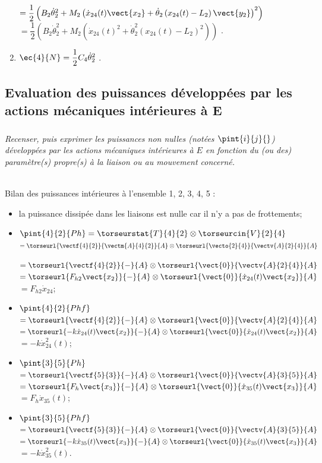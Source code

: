 \begin{multicols}{2}
\begin{corrige}
\begin{enumerate}
$=\dfrac{1}{2}\left( B_2 \dot{\theta}_2^2 +M_2\left(\dot{x}_{24}(t)  \vect{x_2}+\dot{\theta}_2\left(  x_{24}(t)  -L_2 \right)\vect{y_2}\right)^2  \right)
$ 
$=\dfrac{1}{2}\left( B_2 \dot{\theta}_2^2 +M_2\left(\dot{x}_{24}(t)^2+\dot{\theta}_2^2\left(  x_{24}(t)  -L_2 \right)^2\right)  \right)
$ 
.
\item $\ec{4}{N}=\dfrac{1}{2}C_4\dot{\theta}_2^2$ . 
\end{enumerate}
\end{corrige}
\else
\fi


\subsection*{Evaluation des puissances développées par les actions mécaniques intérieures à E}
\subparagraph{}\textit{Recenser, puis exprimer les puissances non nulles (notées $\pint{i}{j}{}$) développées par les actions mécaniques intérieures à $E$ en fonction du (ou des) paramètre(s) propre(s) à la liaison ou au mouvement concerné.}
\ifprof
\begin{corrige} ~\\

Bilan des puissances intérieures à l'ensemble 1, 2, 3, 4, 5 :
\begin{itemize}
\item la puissance dissipée dans les liaisons est nulle car il n'y a pas de frottements;
\item  $\pint{4}{2}{Ph} = \torseurstat{T}{4}{2}\otimes \torseurcin{V}{2}{4}$ 
$=\torseurl{\vectf{4}{2}}{\vectm{A}{4}{2}}{A}\otimes \torseurl{\vecto{2}{4}}{\vectv{A}{2}{4}}{A}$ 

 $=\torseurl{\vectf{4}{2}}{-}{A}\otimes \torseurl{\vect{0}}{\vectv{A}{2}{4}}{A}$
  $=\torseurl{F_{h2}\vect{x_2}}{-}{A}\otimes \torseurl{\vect{0}}{ \dot{x}_{24}(t)  \vect{x_2}}{A}$
  $=F_{h2}\dot{x}_{24}$;

  \item  $\pint{4}{2}{Phf}  $
 $=\torseurl{\vectf{4}{2}}{-}{A}\otimes \torseurl{\vect{0}}{\vectv{A}{2}{4}}{A}$
  $=\torseurl{-k\dot{x}_{24}(t)  \vect{x_2}}{-}{A}\otimes \torseurl{\vect{0}}{ \dot{x}_{24}(t)  \vect{x_2}}{A}$  $=-k\dot{x}_{24}^2(t)$;
\item  $\pint{3}{5}{Ph}  $
$=\torseurl{\vectf{5}{3}}{-}{A}\otimes \torseurl{\vect{0}}{\vectv{A}{3}{5}}{A}$
$=\torseurl{F_h  \vect{x_3}}{-}{A}\otimes \torseurl{\vect{0}}{ \dot{x}_{35}(t)  \vect{x_3}}{A}$ $=F_h\dot{x}_{35}(t)$;
\item  $\pint{3}{5}{Phf}  $
$=\torseurl{\vectf{5}{3}}{-}{A}\otimes \torseurl{\vect{0}}{\vectv{A}{3}{5}}{A}$
$=\torseurl{-k\dot{x}_{35}(t)  \vect{x_3}}{-}{A}\otimes \torseurl{\vect{0}}{ \dot{x}_{35}(t)  \vect{x_3}}{A}$ $=-k\dot{x}_{35}^2(t)$.
\end{itemize}


\end{corrige}
\end{multicols}
